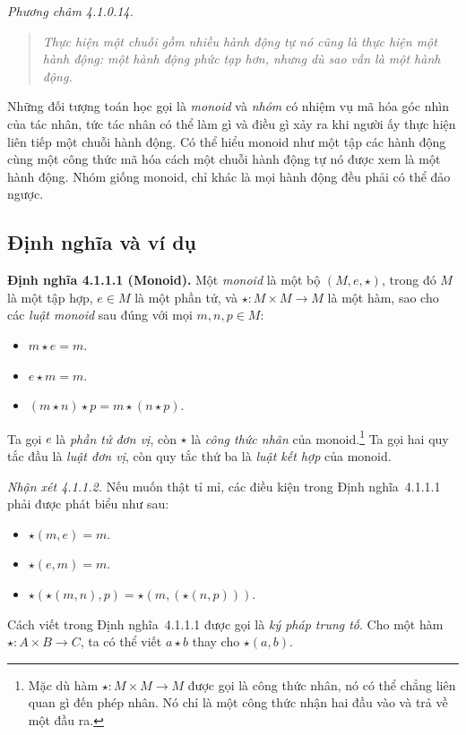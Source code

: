 \noindent\textit{Phương châm 4.1.0.14.}\keepwithnext
\begin{quote}\emph{Thực hiện một chuỗi gồm nhiều hành động tự nó cũng là thực hiện một hành động: một hành động phức tạp hơn, nhưng dù sao vẫn là một hành động.}\end{quote}

Những đối tượng toán học gọi là \emph{monoid} và \emph{nhóm} có nhiệm vụ mã hóa góc nhìn của tác nhân, tức tác nhân có thể làm gì và điều gì xảy ra khi người ấy thực hiện liên tiếp một chuỗi hành động. Có thể hiểu monoid như một tập các hành động cùng một công thức mã hóa cách một chuỗi hành động tự nó được xem là một hành động. Nhóm giống monoid, chỉ khác là mọi hành động đều phải có thể đảo ngược.

\subsection{Định nghĩa và ví dụ}

\noindent\textbf{Định nghĩa 4.1.1.1 (Monoid).} Một \emph{monoid} là một bộ $(M,e,\star)$, trong đó $M$ là một tập hợp, $e\in M$ là một phần tử, và $\star:M\times M\to M$ là một hàm, sao cho các \emph{luật monoid} sau đúng với mọi $m,n,p\in M$:
\begin{itemize}
\item $m\star e=m$.
\item $e\star m=m$.
\item $(m\star n)\star p=m\star(n\star p)$.
\end{itemize}
Ta gọi $e$ là \emph{phần tử đơn vị}, còn $\star$ là \emph{công thức nhân} của monoid.\footnote{Mặc dù hàm $\star:M\times M\to M$ được gọi là công thức nhân, nó có thể chẳng liên quan gì đến phép nhân. Nó chỉ là một công thức nhận hai đầu vào và trả về một đầu ra.} Ta gọi hai quy tắc đầu là \emph{luật đơn vị}, còn quy tắc thứ ba là \emph{luật kết hợp} của monoid.

\noindent\textit{Nhận xét 4.1.1.2.} Nếu muốn thật tỉ mỉ, các điều kiện trong Định nghĩa~4.1.1.1 phải được phát biểu như sau:
\begin{itemize}
\item $\star(m,e)=m$.
\item $\star(e,m)=m$.
\item $\star(\star(m,n),p)=\star(m,(\star(n,p)))$.
\end{itemize}
Cách viết trong Định nghĩa~4.1.1.1 được gọi là \emph{ký pháp trung tố}. Cho một hàm $\star:A\times B\to C$, ta có thể viết $a\star b$ thay cho $\star(a,b)$.

